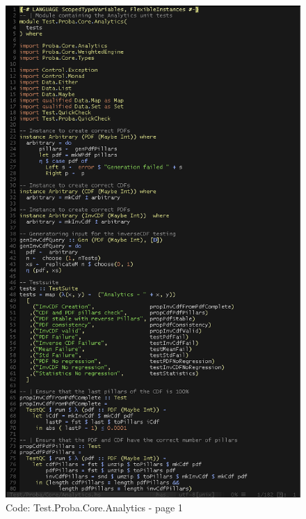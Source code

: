 \documentclass[12pt,a4paper,titlepage]{article}
\begin{document}
\begin{figure}[h!]
\centering
\includegraphics[width=1\textwidth]{img/code-test-analytics-1.png}
\caption{Code: Test.Proba.Core.Analytics - page 1}
\label{fig:test.a1}
\end{figure}
\end{document}
